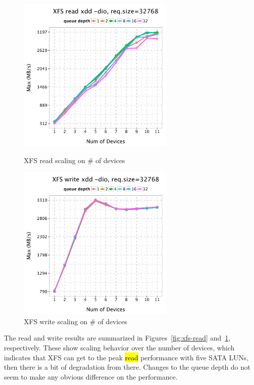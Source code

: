\documentclass{article}
\begin{document}
\begin{figure}[htb]
\centering
\begin{minipage}[t]{0.5\linewidth}
\centering
\includegraphics[width=3in]{data/xdd-read}
\caption{XFS read scaling on \# of devices}
\label{fig:xfs-read}
\end{minipage}%
\begin{minipage}[t]{0.5\linewidth}
\centering
\includegraphics[width=3in]{data/xdd-write}
\caption{XFS write scaling on \# of devices}
\label{fig:xfs-write}
\end{minipage}%
\end{figure}

The read and write results are summarized in Figures~\ref{fig:xfs-read}
and~\ref{fig:xfs-write}, respectively. These show scaling behavior over the number of devices, which
indicates that XFS can get to the peak \hl{read} performance with five SATA LUNs, then there
is a bit of degradation from there. Changes to
the queue depth do not seem to make any obvious difference on the performance.
\end{document}
